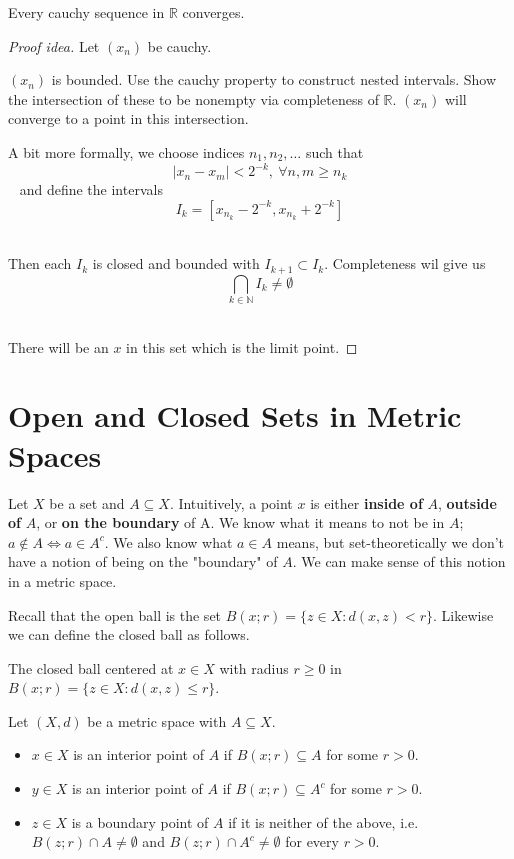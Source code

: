 \begin{thm}
    Every cauchy sequence in $\mathbb R$ converges. 
\end{thm}
\begin{proof}[Proof idea]
    Let $(x_n)$ be cauchy. 

    $(x_n)$ is bounded. Use the cauchy property to construct nested 
    intervals. Show the intersection of these to be nonempty 
    via completeness of $\mathbb R$. 
    $(x_n)$ will converge to a point in this intersection. 

    A bit more formally, we choose indices $n_1, n_2, \ldots$ 
    such that 
    $$ 
        |x_n - x_m| < 2^{-k}, \: \forall n,m \geq n_k
    $$ 
    and define the intervals 
    $$ 
        I_k = [x_{n_k} - 2^{-k}, x_{n_k} + 2^{-k}]
    $$ 

    Then each $I_k$ is closed and bounded with $I_{k+1} \subset I_k$.
    Completeness wil give us 
    $$ 
        \bigcap_{k \in \mathbb N} I_k \neq \emptyset
    $$ 
    
    There will be an $x$ in this set which is the limit point. 
\end{proof}

\newpage 
\section{Open and Closed Sets in Metric Spaces}
Let $X$ be a set and $A \subseteq X$. 
Intuitively, a point $x$ is either \textbf{inside of} $A$, 
\textbf{outside of} $A$, or \textbf{on the boundary} of A.  
We know what it means to not be in $A$; $a \not\in A \Leftrightarrow 
a \in A^c$. 
We also know what $a \in A$ means, but set-theoretically we don't 
have a notion of being on the "boundary" of $A$. 
We can make sense of this notion in a metric space. 

Recall that the open ball is the set 
$B(x;r) = \{z \in X : d(x,z) < r\}$. Likewise we can define 
the closed ball as follows. 

\begin{defn}
    The closed ball centered at $x \in X$ with radius $r \geq 0$ in 
    $B(x;r) = \{z \in X : d(x,z) \leq r\}$. 
\end{defn}

Let $(X,d)$ be a metric space with $A \subseteq X$. 

\begin{itemize}
    \item $x \in X$ is an interior point of $A$ if 
        $B(x;r) \subseteq A$ for some $r > 0$. 
    \item $y \in X$ is an interior point of $A$ if 
        $B(x;r) \subseteq A^c$ for some $r > 0$. 
    \item $z \in X$ is a boundary point of $A$ if it is neither of 
        the above, i.e. 
        $B(z;r) \cap A \neq \emptyset$ and $B(z;r) \cap A^c \neq  
        \emptyset$ for every $r > 0$.
\end{itemize}

